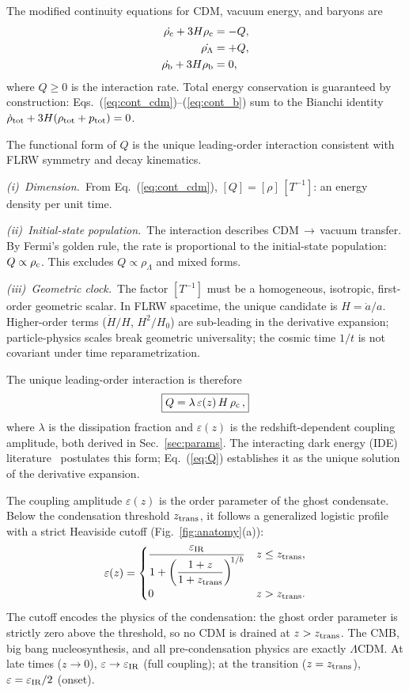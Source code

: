 \documentclass[a4paper,fleqn]{cas-dc}
\newcommand{\eps}{\varepsilon}
\newcommand{\epsIR}{\varepsilon_{\rm IR}}
\newcommand{\ztrans}{z_{\rm trans}}
\newcommand{\rhoc}{\rho_{\rm c}}
\newcommand{\rhoL}{\rho_\Lambda}
\newcommand{\rhob}{\rho_{\rm b}}
\begin{document}
The modified continuity equations for CDM, vacuum energy, and baryons
are
\begin{align}
\dot{\rhoc} + 3H\rhoc &= -Q, \label{eq:cont_cdm} \\
\dot{\rhoL} &= +Q, \label{eq:cont_de} \\
\dot{\rhob} + 3H\rhob &= 0, \label{eq:cont_b}
\end{align}
where $Q \geq 0$ is the interaction rate. Total energy conservation
is guaranteed by construction:
Eqs.~(\ref{eq:cont_cdm})--(\ref{eq:cont_b}) sum to the Bianchi
identity
$\dot{\rho}_{\rm tot} + 3H(\rho_{\rm tot} + p_{\rm tot}) = 0$.

The functional form of $Q$ is the unique leading-order interaction
consistent with FLRW symmetry and decay kinematics.

\textit{(i)~Dimension.}~From Eq.~(\ref{eq:cont_cdm}),
$[Q] = [\rho]\,[T^{-1}]$: an energy density per unit time.

\textit{(ii)~Initial-state population.}~The interaction describes
CDM$\,\to\,$vacuum transfer. By Fermi's golden rule, the rate is
proportional to the initial-state population: $Q \propto \rhoc$.
This excludes $Q \propto \rhoL$ and mixed forms.

\textit{(iii)~Geometric clock.}~The factor $[T^{-1}]$ must be a
homogeneous, isotropic, first-order geometric scalar. In FLRW
spacetime, the unique candidate is $H = \dot{a}/a$. Higher-order
terms ($\dot{H}/H$, $H^2/H_0$) are sub-leading in the derivative
expansion; particle-physics scales break geometric universality;
the cosmic time $1/t$ is not covariant under time reparametrization.

The unique leading-order interaction is therefore
\begin{equation}
\boxed{Q = \lambda\,\eps(z)\,H\,\rhoc\,,}
\label{eq:Q}
\end{equation}
where $\lambda$ is the dissipation fraction and $\eps(z)$ is the
redshift-dependent coupling amplitude, both derived in
Sec.~\ref{sec:params}. The interacting dark energy (IDE)
literature~\cite{valiviita2008, gavela2009, divalentino2020}
postulates this form; Eq.~(\ref{eq:Q}) establishes it as the unique
solution of the derivative expansion.

The coupling amplitude $\eps(z)$ is the order parameter of the ghost
condensate. Below the condensation threshold $\ztrans$, it follows a
generalized logistic profile with a strict Heaviside cutoff
(Fig.~\ref{fig:anatomy}(a)):
\begin{equation}
\eps(z) = \begin{cases}
\dfrac{\epsIR}{\displaystyle
  1 + \left(\frac{1+z}{1+\ztrans}\right)^{\!1/b}}
  & z \leq \ztrans, \\[10pt]
0 & z > \ztrans.
\end{cases}
\label{eq:eps}
\end{equation}
The cutoff encodes the physics of the condensation: the ghost order
parameter is strictly zero above the threshold, so no CDM is drained
at $z > \ztrans$. The CMB, big bang nucleosynthesis, and all
pre-condensation physics are exactly $\Lambda$CDM. At late times
($z \to 0$), $\eps \to \epsIR$ (full coupling); at the transition
($z = \ztrans$), $\eps = \epsIR/2$ (onset).
\end{document}
